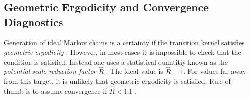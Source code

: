 \subsection{Geometric Ergodicity and Convergence Diagnostics}
Generation of ideal Markov chains is a certainty if the transition kernel satisfies \textit{geometric ergodicity} \cite{geometric_ergodicity}.
However, in most cases it is impossible to check that the condition is satisfied. Instead one uses a statistical quantitiy known
as the \textit{potential scale reduction factor} $\hat{R}$ \cite{rhat}. The ideal value is $\hat{R} = 1$. For values far away from this target,
it is unlikely that geometric ergodicity is satisfied. Rule-of-thumb is to assume convergence
if $\hat{R} < 1.1$ \cite{convergence_diagnostics}.



